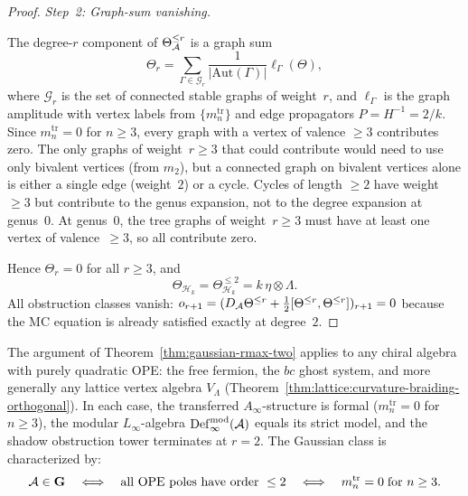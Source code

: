 \begin{proof}
\medskip
\emph{Step~2: Graph-sum vanishing.}

The degree-$r$ component of $\Theta_{\mathcal{A}}^{\leq r}$ is
a graph sum
\[
\Theta_r = \sum_{\Gamma \in \mathcal{G}_r}
\frac{1}{|\mathrm{Aut}(\Gamma)|}
\ell_\Gamma(\Theta),
\]
where $\mathcal{G}_r$ is the set of connected stable
graphs of weight~$r$, and $\ell_\Gamma$ is the graph
amplitude with vertex labels from $\{m_n^{\mathrm{tr}}\}$
and edge propagators $P = H^{-1} = 2/k$. Since
$m_n^{\mathrm{tr}} = 0$ for $n \geq 3$, every graph with
a vertex of valence $\geq 3$ contributes zero. The only
graphs of weight~$r \geq 3$ that could contribute would
need to use only bivalent vertices (from $m_2$), but a
connected graph on bivalent vertices alone is either a
single edge (weight~$2$) or a cycle. Cycles of length
$\geq 2$ have weight $\geq 3$ but contribute to the
genus expansion, not to the degree expansion at genus~$0$.
At genus~$0$, the tree graphs of weight~$r \geq 3$ must
have at least one vertex of valence~$\geq 3$, so all
contribute zero.

Hence $\Theta_r = 0$ for all $r \geq 3$, and
\begin{equation}\label{eq:heisenberg-theta-final}
\Theta_{\mathcal{H}_k} = \Theta^{\leq 2}_{\mathcal{H}_k}
= k\,\eta \otimes \Lambda.
\end{equation}
All obstruction classes vanish:
$o_{r+1} = (D_{\mathcal{A}} \Theta^{\leq r} +
\frac{1}{2}[\Theta^{\leq r}, \Theta^{\leq r}])_{r+1}
= 0$ because the MC equation is already satisfied
exactly at degree~$2$.
\end{proof}

\begin{remark}
\label{rem:gaussian-class-general}
The argument of Theorem~\ref{thm:gaussian-rmax-two}
applies to any chiral algebra with purely quadratic OPE:
the free fermion, the $bc$ ghost system, and more generally
any lattice vertex algebra $V_\Lambda$
(Theorem~\ref{thm:lattice:curvature-braiding-orthogonal}).
In each case, the transferred $A_\infty$-structure is
formal ($m_n^{\mathrm{tr}} = 0$ for $n \geq 3$),
the modular $L_\infty$-algebra $\operatorname{Def}_{\infty}^{\mathrm{mod}}(\mathcal{A})$ equals
its strict model, and the shadow obstruction tower terminates at
$r = 2$. The Gaussian class is characterized by:
\begin{equation}\label{eq:gaussian-characterization}
\mathcal{A} \in \textbf{G}
\quad\Longleftrightarrow\quad
\text{all OPE poles have order } \leq 2
\quad\Longleftrightarrow\quad
m_n^{\mathrm{tr}} = 0 \;\text{for } n \geq 3.
\end{equation}
\end{remark}

